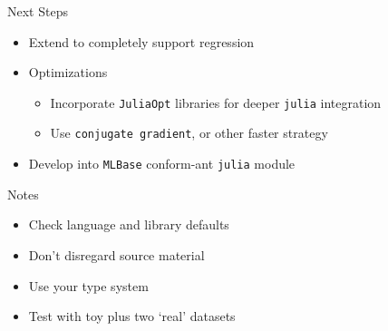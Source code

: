 \documentclass[10pt]{beamer}
\begin{document}
\begin{frame}{Next Steps}
  \begin{itemize}
  \item Extend to completely support regression
  \item Optimizations
    \begin{itemize}
    \item Incorporate \texttt{JuliaOpt} libraries for deeper \texttt{julia} integration
    \item Use \texttt{conjugate gradient}, or other faster strategy
    \end{itemize}
  \item Develop into \texttt{MLBase} conform-ant \texttt{julia} module
  \end{itemize}
\end{frame}

\begin{frame}{Notes}
  \begin{itemize}
  \item Check language and library defaults
  \item Don't disregard source material
  \item Use your type system
  \item Test with toy plus two `real' datasets
  \end{itemize}
\end{frame}
\end{document}

